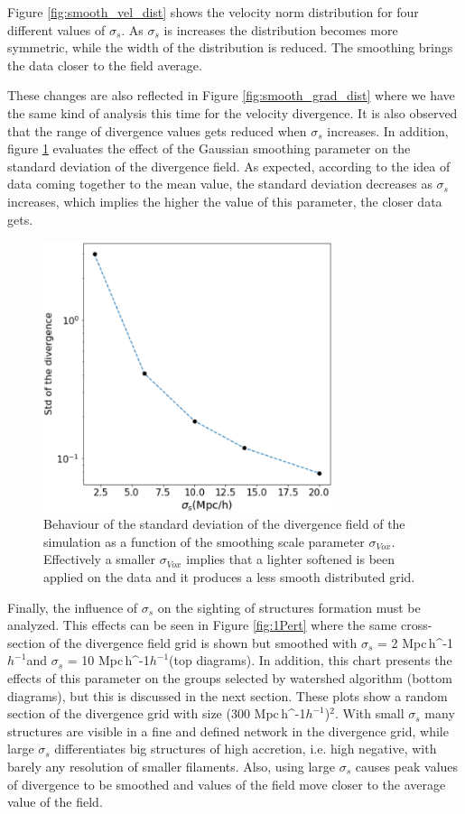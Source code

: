 \documentclass[usenatbib]{mnras}
\newcommand{\Mpch}{\,{\rm Mpc}\,\ifmmode h^{-1}\else $h^{-1}$\fi}
\begin{document}
Figure \ref{fig:smooth_vel_dist} shows the velocity norm distribution for four different values of $\sigma_s$.
As $\sigma_s$ is increases the distribution becomes more symmetric, while the  width of the distribution
is reduced.
The smoothing brings the data closer to the field average.

These changes are also reflected in  Figure \ref{fig:smooth_grad_dist} where we have the same kind of analysis this time for the velocity divergence.
It is also observed that the range of divergence values gets reduced when $\sigma_s$ increases. In addition, figure \ref{fig:std_smooth} evaluates the effect of the Gaussian smoothing parameter on the standard deviation of the divergence field. As expected, according to the idea of data coming together to the mean value, the standard deviation decreases as $\sigma_s$ increases, which implies the higher the value of this parameter, the closer data gets.



\begin{figure}
    \centering
    \includegraphics[width=240pt]{std_smooth.pdf}
    \caption{Behaviour of the standard deviation of the divergence field of
      the simulation as a function of the smoothing scale parameter
      $\sigma_{Vox}$. Effectively a smaller $\sigma_{Vox}$ implies that a lighter softened is been applied
      on the data and it produces a less smooth distributed grid.} 
    \label{fig:std_smooth}
\end{figure}


Finally, the influence of $\sigma_s$ on the sighting of structures formation must be analyzed. This effects can be seen in Figure \ref{fig:1Pert} where the same cross-section of the divergence field grid is shown but smoothed with $\sigma_s$ = 2\,\Mpch and $\sigma_s$ = 10\,\Mpch (top diagrams). In addition, this chart presents the effects of this parameter on the groups selected by watershed algorithm (bottom diagrams), but this is discussed in the next section. These plots show a random section of the divergence grid with size (300\,\Mpch)$^2$. With small $\sigma_{s}$ many structures are visible in a fine and defined network in the divergence grid, while large $\sigma_{s}$ differentiates big structures of high accretion, i.e. high negative, with barely any resolution of smaller filaments. Also, using large $\sigma_{s}$ causes peak values of divergence to be smoothed and values of the field move closer to  the average value of the field. 
\end{document}
